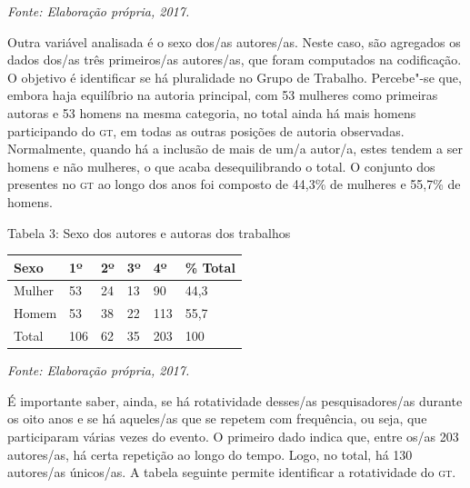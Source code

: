 \begin{center}
{\footnotesize\emph{Fonte: Elaboração própria, 2017.}}
\end{center}

Outra variável analisada é o sexo dos/as autores/as. Neste caso, são
agregados os dados dos/as três primeiros/as autores/as, que foram
computados na codificação. O objetivo é identificar se há pluralidade no
Grupo de Trabalho. Percebe"-se que, embora haja equilíbrio na autoria
principal, com 53 mulheres como primeiras autoras e 53 homens na mesma
categoria, no total ainda há mais homens participando do \textsc{gt}, em todas as
outras posições de autoria observadas. Normalmente, quando há a inclusão
de mais de um/a autor/a, estes tendem a ser homens e não mulheres, o que
acaba desequilibrando o total. O conjunto dos presentes no \textsc{gt} ao longo
dos anos foi composto de 44,3\% de mulheres e 55,7\% de homens.

\begin{center}
Tabela 3: Sexo dos autores e autoras dos trabalhos
\end{center}

\begin{center}
\centering
\begin{tabular}{|l|l|l|l|l|l|}
\hline
Sexo & 1º & 2º & 3º & 4º & \% Total \\ \hline
Mulher & 53 & 24 & 13 & 90 & 44,3 \\ \hline
Homem & 53 & 38 & 22 & 113 & 55,7 \\ \hline
Total & 106 & 62 & 35 & 203\footnotemark & 100 \\ \hline
\end{tabular}
\end{center}

\begin{center}
{\footnotesize\emph{Fonte: Elaboração própria, 2017.}}
\end{center}


É importante saber, ainda, se há rotatividade desses/as pesquisadores/as
durante os oito anos e se há aqueles/as que se repetem com frequência,
ou seja, que participaram várias vezes do evento. O primeiro dado indica
que, entre os/as 203 autores/as, há certa repetição ao longo do tempo.
Logo, no total, há 130 autores/as únicos/as. A tabela seguinte permite
identificar a rotatividade do \textsc{gt}.

